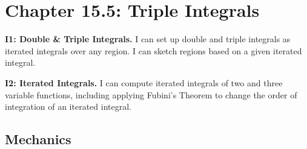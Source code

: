 
\fancyhead[R]{\dayeighteen}

\section*{\centering Chapter 15.5: Triple Integrals}
\textbf{I1: Double \& Triple Integrals.} I can set up double and triple integrals as iterated integrals over any region. I can sketch regions based on a given iterated integral.

\textbf{I2: Iterated Integrals.} I can compute iterated integrals of two and three variable functions, including applying Fubini's Theorem to change the order of integration of an iterated integral.

\subsection*{Mechanics}
